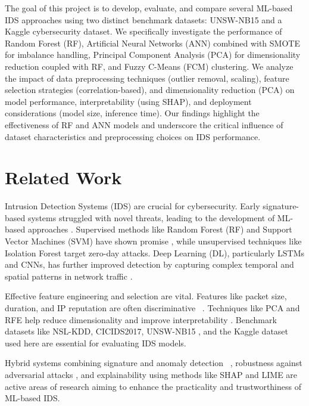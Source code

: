 \documentclass[sigconf,screen,final,nonacm]{acmart}
\begin{document}
The goal of this project is to develop, evaluate, and compare several ML-based IDS approaches using two distinct benchmark datasets: UNSW-NB15 and a Kaggle cybersecurity dataset. We specifically investigate the performance of Random Forest (RF), Artificial Neural Networks (ANN) combined with SMOTE for imbalance handling, Principal Component Analysis (PCA) for dimensionality reduction coupled with RF, and Fuzzy C-Means (FCM) clustering. We analyze the impact of data preprocessing techniques (outlier removal, scaling), feature selection strategies (correlation-based), and dimensionality reduction (PCA) on model performance, interpretability (using SHAP), and deployment considerations (model size, inference time). Our findings highlight the effectiveness of RF and ANN models and underscore the critical influence of dataset characteristics and preprocessing choices on IDS performance.

\section{Related Work}
Intrusion Detection Systems (IDS) are crucial for cybersecurity. Early signature-based systems struggled with novel threats, leading to the development of ML-based approaches \cite{tavallaee2009detailed}. Supervised methods like Random Forest (RF) and Support Vector Machines (SVM) have shown promise \cite{indra2024ensemble}, while unsupervised techniques like Isolation Forest target zero-day attacks. Deep Learning (DL), particularly LSTMs and CNNs, has further improved detection by capturing complex temporal and spatial patterns in network traffic \cite{9889698, alsamiri2023federated}.

Effective feature engineering and selection are vital. Features like packet size, duration, and IP reputation are often discriminative ~\cite{9887796}. Techniques like PCA and RFE help reduce dimensionality and improve interpretability \cite{shiravi2012toward}. Benchmark datasets like NSL-KDD, CICIDS2017, UNSW-NB15 \cite{10.1145/3658644.3691410}, and the Kaggle dataset used here \cite{kumar2023cybersecurity} are essential for evaluating IDS models.

Hybrid systems combining signature and anomaly detection ~\cite{indra2024ensemble}, robustness against adversarial attacks \cite{9887796, alsamiri2023federated}, and explainability using methods like SHAP and LIME \cite{molnar2020interpretable} are active areas of research aiming to enhance the practicality and trustworthiness of ML-based IDS.
\end{document}
